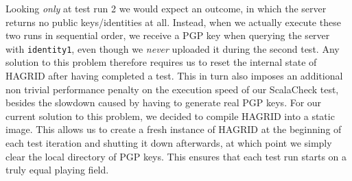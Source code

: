 Looking \emph{only} at test run 2 we would expect an outcome, in which the server returns no public keys/identities at all. Instead, when we actually execute these two runs in sequential order, we receive a PGP key when querying the server with \texttt{identity1}, even though we \emph{never} uploaded it during the second test. 
Any solution to this problem therefore requires us to reset the internal state of HAGRID after having completed a test.
This in turn also imposes an additional non trivial performance penalty on the execution speed of our ScalaCheck test, besides the slowdown caused by having to generate real PGP keys. 
For our current solution to this problem, we decided to compile HAGRID into a static image. This allows us to create a fresh instance of HAGRID at the beginning of each test iteration and shutting it down afterwards, at which point we simply clear the local directory of PGP keys. This ensures that each test run starts on a truly equal playing field.


